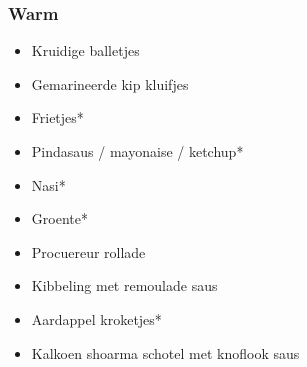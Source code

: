 \subsubsection*{Warm}
\begin{itemize}
	\item	Kruidige balletjes
	\item	Gemarineerde kip kluifjes
	\item	Frietjes*
	\item	Pindasaus / mayonaise / ketchup*
	\item	Nasi*
	\item	Groente*
	\item	Procuereur rollade
	\item	Kibbeling met remoulade saus
	\item	Aardappel kroketjes*
	\item Kalkoen shoarma schotel met knoflook saus
\end{itemize}

\newpage
